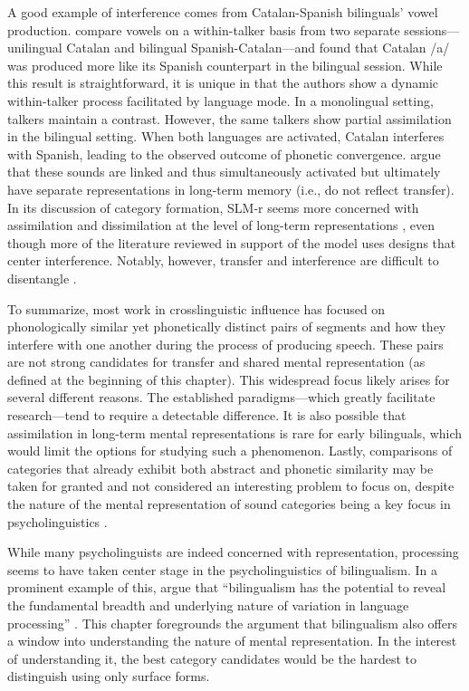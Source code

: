 A good example of interference comes from Catalan-Spanish bilinguals' vowel production. \citet{simonet_2019_convergence} compare vowels on a within-talker basis from two separate sessions---unilingual Catalan and bilingual Spanish-Catalan---and found that Catalan /a/ was produced more like its Spanish counterpart in the bilingual session. While this result is straightforward, it is unique in that the authors show a dynamic within-talker process facilitated by language mode. In a monolingual setting, talkers maintain a contrast. However, the same talkers show partial assimilation in the bilingual setting. When both languages are activated, Catalan interferes with Spanish, leading to the observed outcome of phonetic convergence. \citet{simonet_2019_convergence} argue that these sounds are linked and thus simultaneously activated but ultimately have separate representations in long-term memory (i.e., do not reflect transfer). In its discussion of category formation, SLM-r seems more concerned with assimilation and dissimilation at the level of long-term representations \citep[i.e., transfer;][]{flege_2021_slmr}, even though more of the literature reviewed in support of the model uses designs that center interference. Notably, however, transfer and interference are difficult to disentangle \citep{grosjean_2011_transfer}.

To summarize, most work in crosslinguistic influence has focused on phonologically similar yet phonetically distinct pairs of segments and how they interfere with one another during the process of producing speech. These pairs are not strong candidates for transfer and shared mental representation (as defined at the beginning of this chapter). This widespread focus likely arises for several different reasons. The established paradigms---which greatly facilitate research---tend to require a detectable difference. It is also possible that assimilation in long-term mental representations is rare for early bilinguals, which would limit the options for studying such a phenomenon. Lastly, comparisons of categories that already exhibit both abstract and phonetic similarity may be taken for granted and not considered an interesting problem to focus on, despite the nature of the mental representation of sound categories being a key focus in psycholinguistics \citep{samuel_2020_resist}. 

While many psycholinguists are indeed concerned with representation, processing seems to have taken center stage in the psycholinguistics of bilingualism. In a prominent example of this, \citeauthor{fricke_2019_bilingualism} argue that ``bilingualism has the potential to reveal the fundamental breadth and underlying nature of variation in language processing'' \citeyearpar[][p. 204]{fricke_2019_bilingualism}. This chapter foregrounds the argument that bilingualism also offers a window into understanding the nature of mental representation. In the interest of understanding it, the best category candidates would be the hardest to distinguish using only surface forms.

